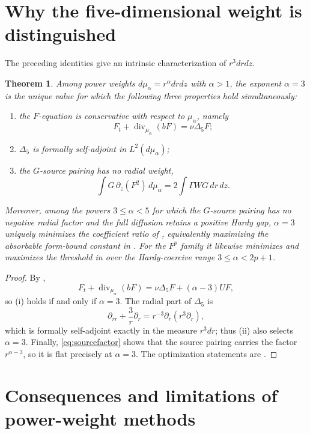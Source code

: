 \documentclass[11pt]{article}
\numberwithin{equation}{section}
\newtheorem{theorem}{Theorem}[section]
\theoremstyle{remark}
\newcommand{\Da}{\Delta_5}
\begin{document}
\section{Why the five-dimensional weight is distinguished}

The preceding identities give an intrinsic characterization of \(r^3drdz\).

\begin{theorem}\label{thm:triple}
Among power weights \(d\mu_\alpha=r^\alpha drdz\) with \(\alpha>1\), the exponent \(\alpha=3\) is the unique value for which the following three properties hold simultaneously:
\begin{enumerate}[label=\textnormal{(\roman*)}]
\item the \(F\)-equation is conservative with respect to \(\mu_\alpha\), namely
\[
 F_t+\operatorname{div}_{\mu_\alpha}(bF)=\nu\Da F;
\]
\item \(\Da\) is formally self-adjoint in \(L^2(d\mu_\alpha)\);
\item the \(G\)-source pairing has no radial weight,
\[
 \int G\,\partial_z(F^2)\,d\mu_\alpha
 =2\int\Gamma WG\,dr\,dz.
\]
\end{enumerate}
Moreover, among the powers \(3\le\alpha<5\) for which the \(G\)-source pairing has no negative radial factor and the full diffusion retains a positive Hardy gap, \(\alpha=3\) uniquely minimizes the coefficient ratio of , equivalently maximizing the absorbable form-bound constant in .  For the \(F^p\) family it likewise minimizes  and maximizes the threshold in  over the Hardy-coercive range \(3\le\alpha<2p+1\).
\end{theorem}

\begin{proof}
By ,
\[
 F_t+\operatorname{div}_{\mu_\alpha}(bF)
 =\nu\Da F+(\alpha-3)UF,
\]
so (i) holds if and only if \(\alpha=3\).  The radial part of \(\Da\) is
\[
 \partial_{rr}+\frac3r\partial_r
 =r^{-3}\partial_r(r^3\partial_r),
\]
which is formally self-adjoint exactly in the measure \(r^3dr\); thus (ii) also selects \(\alpha=3\).  Finally, \eqref{eq:sourcefactor} shows that the source pairing carries the factor \(r^{\alpha-3}\), so it is flat precisely at \(\alpha=3\).  The optimization statements are .
\end{proof}

\section{Consequences and limitations of power-weight methods}
\end{document}
